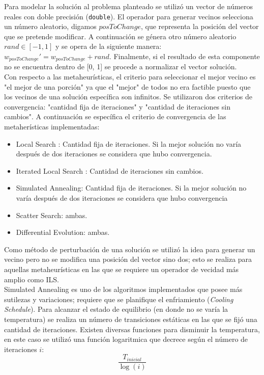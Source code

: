 \documentclass{ci5652}
\begin{document}
Para modelar la solución al problema planteado se utilizó un vector de números
reales con doble precisión (\texttt{double}). El operador para generar vecinos
selecciona un número aleatorio, digamos $posToChange$, que representa la
posición del vector que se pretende modificar. A continuación se génera otro
número aleatorio $rand \in [-1, 1]$ y se opera de la siguiente manera:
$w_{posToChange}' =  w_{posToChange} + rand$. Finalmente, si el resultado de
esta componente no se encuentra dentro de [0, 1] se procede a normalizar el
vector solución.\\

Con respecto a las metaheurísticas, el criterio para seleccionar el mejor vecino
es "el mejor de una porción" ya que el "mejor" de todos no era factible puesto
que los vecinos de una solución específica son infinitos. Se utilizaron dos
criterios de convergencia: "cantidad fija de iteraciones" y "cantidad de
iteraciones sin cambios". A continuación se específica el criterio de
convergencia de las metaherísticas implementadas:

\begin{itemize}
  \item Local Search : Cantidad fija de iteraciones. Si la mejor solución no
  varía después de dos iteraciones se considera que hubo convergencia.
  \item Iterated Local Search : Cantidad de iteraciones sin cambios.
  \item Simulated Annealing: Cantidad fija de iteraciones. Si la mejor solución
  no varía después de dos iteraciones se considera que hubo convergencia
  \item Scatter Search: ambas.
  \item Differential Evolution: ambas.
\end{itemize}

Como método de perturbación de una solución se utilizó la idea para generar un
vecino pero no se modifica una posición del vector sino dos; esto se realiza
para aquellas metaheurísticas en las que se requiere un operador de vecidad
más amplio como ILS.\\

Simulated Annealing es uno de los algoritmos implementados que posee más
sutilezas y variaciones; requiere que se planifique el enfriamiento
(\textit{Cooling Schedule}). Para alcanzar el estado de equilibrio (en donde no
se varía la temperatura) se realiza un número de transiciones estáticas en las
que se fijó una cantidad de iteraciones. Existen diversas funciones para
disminuir la temperatura, en este caso se utilizó una función logaritmica que
decrece según el número de iteraciones $i$: $$\frac{T_{inicial}}{\log(i)}$$
\end{document}
